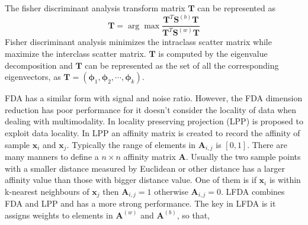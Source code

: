 \documentclass[conference,compsoc]{IEEEtran}
\begin{document}
The fisher discriminant analysis transform matrix $\bm{T}$ can be represented as 
\begin{equation}
\bm{T} = \arg\max \frac{\bm{T}^T\bm{S}^{(b)}\bm{T}}{\bm{T}^T\bm{S}^{(w)}\bm{T}}
\end{equation}
Fisher discriminant analysis minimizes the intraclass scatter matrix while maximize the interclass scatter matrix. $\bm{T}$ is computed by the eigenvalue decomposition and $\bm{T}$ can be represented as the set of all the corresponding eigenvectors, as $ \bm{T} = (\bm{\phi}_1,\bm{\phi}_2,\cdots,\bm{\phi}_k)$.

FDA has a similar form with signal and noise ratio. However, the FDA dimension reduction has poor performance for it doesn't consider the locality of data when dealing with multimodality. In \cite{LPP} locality preserving projection (LPP) is proposed to exploit data locality. In LPP an affinity matrix is created to record the affinity of sample $\bm{x}_i$ and $\bm{x}_j$.  Typically the range of elements in $\bm{A}_{i,j}$ is $[0,1]$. There are many manners to define a $n \times n$ affinity matrix $\bm{A}$. Usually the two sample points with a smaller distance measured by Euclidean or other distance has a larger affinity value than those with bigger distance value. One of them is if  $\bm{x}_i$ is within k-nearest neighbours of $\bm{x}_j$ then $\bm{A}_{i,j} = 1$ otherwise  $\bm{A}_{i,j} = 0$.  LFDA combines FDA and LPP and has a more strong performance. The key in LFDA is it assigns weights to elements in $\bm{A}^{(w)}$ and $\bm{A}^{(b)}$, so that,

%
%
\end{document}
